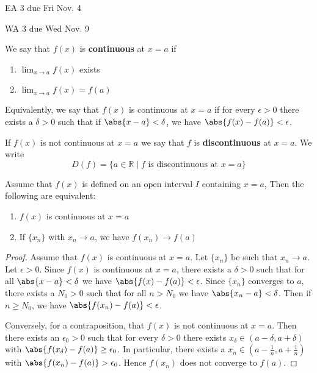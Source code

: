 
EA 3 due Fri Nov. 4

WA 3 due Wed Nov. 9


\begin{defn}[Continuity]
We say that $f(x)$ is \textbf{continuous} at $x=a$ if \begin{enumerate}
    \item $\lim_{x\to a} f(x)$ exists
    \item $\lim_{x\to a} f(x) = f(a)$
\end{enumerate}
Equivalently, we say that $f(x)$ is continuous at $x=a$ if for every $\epsilon>0$ there exists a $\delta > 0$ such that if $\abs{x-a}<\delta$, we have $\abs{f(x) - f(a)}<\epsilon$. 
\end{defn}

If $f(x)$ is not continuous at $x=a$ we say that $f$ is \textbf{discontinuous} at $x=a$. We write \[D(f) =\{a\in\mathbb{R} \mid f \text{ is discontinuous at }x=a\}\]

\begin{thm}
Assume that $f(x)$ is defined on an open interval $I$ containing $x=a$, Then the following are equivalent: \begin{enumerate}
    \item $f(x)$ is continuous at $x=a$
    \item If $\{x_n\}$ with $x_n\to a$, we have $f(x_n)\to f(a)$
\end{enumerate}
\end{thm}

\begin{proof}
Assume that $f(x)$ is continuous at $x=a$. Let $\{x_n\}$ be such that $x_n\to a$. Let $\epsilon > 0$. Since $f(x)$ is continuous at $x=a$, there exists a $\delta > 0$ such that for all $\abs{x-a}<\delta$ we have $\abs{f(x) - f(a)} < \epsilon$. Since $\{x_n\}$ converges to $a$, there exists a $N_0>0$ such that for all $n>N_0$ we have $\abs{x_n-a}<\delta$. Then if $n\geq N_0$, we have $\abs{f(x_n)-f(a)}<\epsilon$.

Conversely, for a contraposition, that $f(x)$ is not continuous at $x=a$. Then there exists an $\epsilon_0 > 0$ such that for every $\delta > 0$ there exists $x_\delta \in (a-\delta,a+\delta)$ with $\abs{f(x_\delta) - f(a)} \geq \epsilon_0$. In particular, there exists a $x_n \in (a-\frac{1}{n},a+\frac{1}{n})$ with $\abs{f(x_n) - f(a)}>\epsilon_0$. Hence $f(x_n)$ does not converge to $f(a)$.
\end{proof}


